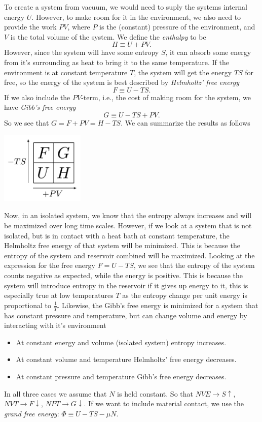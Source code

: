 \documentclass[a4paper, 11pt, notitlepage, english]{article}
\begin{document}
To create a system from vacuum, we would need to suply the systems internal energy $U$. However, to make room for it in the environment, we also need to provide the work $PV$, where $P$ is the (constant) pressure of the environment, and $V$ is the total volume of the system. We define the \emph{enthalpy} to be 
$$H \equiv U + PV.$$
However, since the system will have some entropy $S$, it can absorb some energy from it's surrounding as heat to bring it to the same temperature. If the environment is at constant temperature $T$, the system will get the energy $TS$ for free, so the energy of the system is best described by \emph{Helmholtz' free energy}
$$F \equiv U - TS.$$
If we also include the $PV$-term, i.e., the cost of making room for the system, we have \emph{Gibb's free energy}
$$G \equiv U - TS + PV.$$
So we see that $G = F + PV = H - TS$. We can summarize the results as follows
\begin{center}
\includegraphics[width=0.3\textwidth]{potentials}
\end{center}

Now, in an isolated system, we know that the entropy always increases and will be maximized over long time scales. However, if we look at a system that is not isolated, but is in contact with a heat bath at constant temperature, the Helmholtz free energy of that system will be minimized. This is because the entropy of the system and reservoir combined will be maximized. Looking at the expression for the free energy $F = U - TS$, we see that the entropy of the system counts negative as expected, while the energy is positive. This is because the system will introduce entropy in the reservoir if it gives up energy to it, this is especially true at low temperatures $T$ as the entropy change per unit energy is proportional to $\frac{1}{T}$. Likewise, the Gibb's free energy is minimized for a system that has constant pressure and temperature, but can change volume and energy by interacting with it's environment
\begin{itemize}
	\item At constant energy and volume (isolated system) entropy increases.
	\item At constant volume and temperature Helmholtz' free energy decreases.
	\item At constant pressure and temperature Gibb's free energy decreases.
\end{itemize}
In all three cases we assume that $N$ is held constant. So that $NVE \to S\uparrow$, $NVT \to F\downarrow$, $NPT\to G\downarrow$. If we want to include material contact, we use the \emph{grand free energy}: $\Phi \equiv U - TS - \mu N$.
\end{document}
